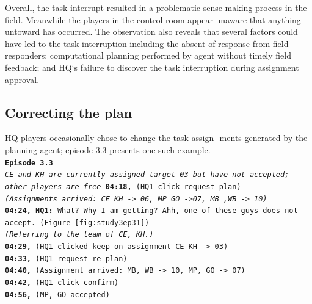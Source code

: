 Overall, the task interrupt resulted in a problematic sense making process in the field. Meanwhile the players in the control room appear unaware that anything untoward has occurred. The observation also reveals that several factors could have led to the task interruption including the absent of response from field responders; computational planning performed by agent without timely field feedback; and HQ`s failure to discover the task interruption during assignment approval. 


\subsection{Correcting the plan}
HQ players occasionally chose to change the task assign- ments generated by the planning agent; episode 3.3 presents one such example.\\

\noindent\texttt{\textbf{Episode 3.3}\\
\emph{CE and KH are currently assigned target 03 but have not accepted; other players are free}
\textbf{04:18,} (HQ1 click request plan)\\
\emph{(Assignments arrived: CE KH -> 06, MP GO ->07, MB ,WB -> 10)}\\
\textbf{04:24, HQ1:}  What? Why I am getting? Ahh, one of these guys does not accept. (Figure \ref{fig:study3ep31}) \\
\emph{(Referring to the team of CE, KH.)}\\
\textbf{04:29,} (HQ1 clicked keep on assignment CE KH -> 03) \\
\textbf{04:33,} (HQ1 request re-plan)\\
\textbf{04:40,} (Assignment arrived: MB, WB -> 10, MP, GO -> 07)\\
\textbf{04:42,} (HQ1 click confirm)\\
\textbf{04:56,} (MP, GO accepted)\\
}

